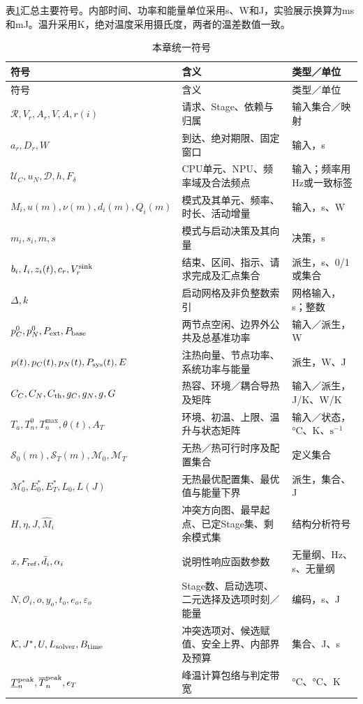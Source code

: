 表\ref{tab:symbols}汇总主要符号。内部时间、功率和能量单位采用s、W和J，实验展示换算为ms和mJ。温升采用K，绝对温度采用摄氏度，两者的温差数值一致。

\begin{longtable}{@{}p{5.8cm}p{5.3cm}p{2.7cm}@{}}
\caption{本章统一符号}\label{tab:symbols}\\
\toprule
符号 & 含义 & 类型／单位 \\
\midrule
\endfirsthead
\toprule
符号 & 含义 & 类型／单位 \\
\midrule
\endhead
\(\mathcal R,V_r,A_r,V,A,r(i)\) & 请求、Stage、依赖与归属 & 输入集合／映射 \\
\(a_r,D_r,W\) & 到达、绝对期限、固定窗口 & 输入，s \\
\(\mathcal U_C,u_N,\mathcal D,h,F_\delta\) & CPU单元、NPU、频率域及合法频点 & 输入；频率用Hz或一致标签 \\
\(M_i,u(m),\nu(m),d_i(m),Q_i(m)\) & 模式及其单元、频率、时长、活动增量 & 输入，s、W \\
\(m_i,s_i,m,s\) & 模式与启动决策及其向量 & 决策，s \\
\(b_i,I_i,z_i(t),c_r,V_r^{\rm sink}\) & 结束、区间、指示、请求完成及汇点集合 & 派生，s、0/1或集合 \\
\(\Delta,k\) & 启动网格及非负整数索引 & 网格输入，s；整数 \\
\(p_C^0,p_N^0,P_{\rm ext},P_{\rm base}\) & 两节点空闲、边界外公共及总基准功率 & 输入／派生，W \\
\(p(t),p_C(t),p_N(t),P_{\rm sys}(t),E\) & 注热向量、节点功率、系统功率与能量 & 派生，W、J \\
\(C_C,C_N,C_{\rm th},g_C,g_N,g,G\) & 热容、环境／耦合导热及矩阵 & 输入／派生，J/K、W/K \\
\(T_a,T_n^0,T_n^{\max},\theta(t),A_T\) & 环境、初温、上限、温升与状态矩阵 & 输入／状态，°C、K、\(\mathrm{s}^{-1}\) \\
\(\mathcal S_0(m),\mathcal S_T(m),\mathcal M_0,\mathcal M_T\) & 无热／热可行时序及配置集合 & 定义集合 \\
\(\mathcal M_0^*,E_0^*,E_T^*,L_0,L(J)\) & 无热最优配置集、最优值与能量下界 & 派生，集合、J \\
\(H,\eta,J,\widehat M_i\) & 冲突方向图、最早起点、已定Stage集、剩余模式集 & 结构分析符号 \\
\(x,F_{\rm ref},\bar d_i,\alpha_i\) & 说明性响应函数参数 & 无量纲、Hz、s、无量纲 \\
\(N,\mathcal O_i,o,y_o,t_o,e_o,\varepsilon_o\) & Stage数、启动选项、二元选择及选项时刻／能量 & 编码，s、J \\
\(\mathcal K,J^*,U,L_{\rm solver},B_{\rm time}\) & 冲突选项对、候选赋值、安全上界、内部界及预算 & 集合、J、s \\
\(\underline T_n^{\rm peak},\overline T_n^{\rm peak},\epsilon_T\) & 峰温计算包络与判定带宽 & °C、°C、K \\
\bottomrule
\end{longtable}

